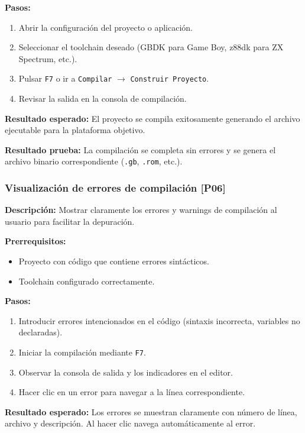 \documentclass[../../main.tex]{subfiles}
\begin{document}
\clearpage

\textbf{Pasos:}
\begin{enumerate}
\item Abrir la configuración del proyecto o aplicación.
\item Seleccionar el toolchain deseado (GBDK para Game Boy, z88dk para ZX Spectrum, etc.).
\item Pulsar \lstinline|F7| o ir a \lstinline|Compilar| $\rightarrow$ \lstinline|Construir Proyecto|.
\item Revisar la salida en la consola de compilación.
\end{enumerate}

\textbf{Resultado esperado:} El proyecto se compila exitosamente generando el archivo ejecutable para la plataforma objetivo.

\textbf{Resultado prueba:} La compilación se completa sin errores y se genera el archivo binario correspondiente (\lstinline|.gb|, \lstinline|.rom|, etc.).

\subsubsection{Visualización de errores de compilación [P06]}

\textbf{Descripción:} Mostrar claramente los errores y warnings de compilación al usuario para facilitar la depuración.

\textbf{Prerrequisitos:} 
\begin{itemize}
\item Proyecto con código que contiene errores sintácticos.
\item Toolchain configurado correctamente.
\end{itemize}

\textbf{Pasos:}
\begin{enumerate}
\item Introducir errores intencionados en el código (sintaxis incorrecta, variables no declaradas).
\item Iniciar la compilación mediante \lstinline|F7|.
\item Observar la consola de salida y los indicadores en el editor.
\item Hacer clic en un error para navegar a la línea correspondiente.
\end{enumerate}

\textbf{Resultado esperado:} Los errores se muestran claramente con número de línea, archivo y descripción. Al hacer clic navega automáticamente al error.
\end{document}
